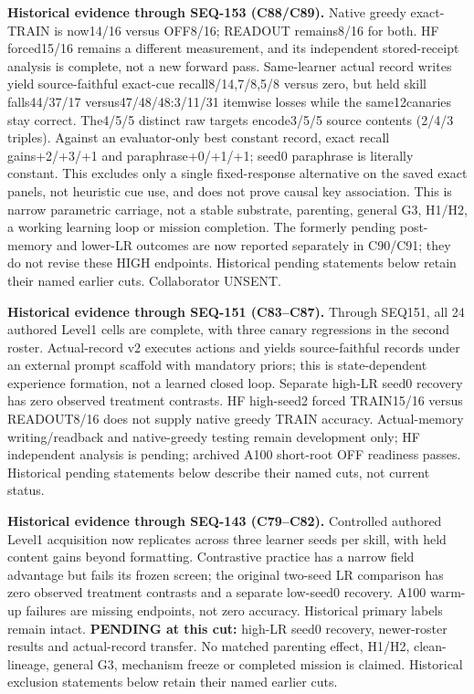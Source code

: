 \documentclass{article}
\begin{document}
\noindent\textbf{Historical evidence through SEQ-153 (C88/C89).}
Native greedy exact-TRAIN is now14/16 versus OFF8/16; READOUT remains8/16
for both. HF forced15/16 remains a different measurement, and its independent
stored-receipt analysis is complete, not a new forward pass. Same-learner actual
record writes yield source-faithful exact-cue recall8/14,7/8,5/8 versus zero,
but held skill falls44/37/17 versus47/48/48:3/11/31 itemwise losses while the
same12canaries stay correct. The4/5/5 distinct raw targets encode3/5/5 source
contents (2/4/3 triples). Against an evaluator-only best constant record, exact
recall gains+2/+3/+1 and paraphrase+0/+1/+1; seed0 paraphrase is literally
constant. This excludes only a single fixed-response alternative on the saved
exact panels, not heuristic cue use, and does not prove causal key association.
This is narrow parametric carriage, not a stable
substrate, parenting, general G3, H1/H2, a working learning loop or mission
completion. The formerly pending post-memory and lower-LR outcomes are now
reported separately in C90/C91; they do not revise these HIGH endpoints. Historical
pending statements below retain their named earlier cuts. Collaborator UNSENT.

\noindent\textbf{Historical evidence through SEQ-151 (C83--C87).}
Through SEQ151, all 24 authored Level1 cells are complete, with three canary
regressions in the second roster. Actual-record v2 executes actions and yields
source-faithful records under an external prompt scaffold with mandatory priors;
this is state-dependent experience formation, not a learned closed loop. Separate
high-LR seed0 recovery has zero observed treatment contrasts. HF high-seed2
forced TRAIN15/16 versus READOUT8/16 does not supply native greedy TRAIN accuracy.
Actual-memory writing/readback and native-greedy testing remain development only;
HF independent analysis is pending; archived A100 short-root OFF readiness passes.
Historical pending statements below describe their named cuts, not current status.

\noindent\textbf{Historical evidence through SEQ-143 (C79--C82).}
Controlled authored Level1 acquisition now replicates across three learner
seeds per skill, with held content gains beyond formatting. Contrastive practice
has a narrow field advantage but fails its frozen screen; the original two-seed
LR comparison has zero observed treatment contrasts and a separate low-seed0 recovery. A100 warm-up
failures are missing endpoints, not zero accuracy. Historical primary labels
remain intact. \textbf{PENDING at this cut:} high-LR seed0 recovery, newer-roster
results and actual-record transfer. No matched parenting effect, H1/H2,
clean-lineage, general G3, mechanism freeze or completed mission is claimed.
Historical exclusion statements below retain their named earlier cuts.
\end{document}
